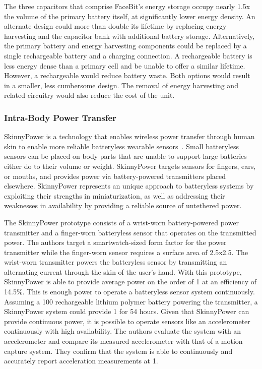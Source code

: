 The three capacitors that comprise FaceBit's energy storage occupy nearly 1.5x the volume of the primary battery itself, at significantly lower energy density.
An alternate design could more than double its lifetime by replacing energy harvesting and the capacitor bank with additional battery storage. 
Alternatively, the primary battery and energy harvesting components could be replaced by a single rechargeable battery and a charging connection.
A rechargeable battery is less energy dense than a primary cell and be unable to offer a similar lifetime. 
However, a rechargeable would reduce battery waste. 
Both options would result in a smaller, less cumbersome design. The removal of energy harvesting and related circuitry would also reduce the cost of the unit.

\subsubsection{Intra-Body Power Transfer}
SkinnyPower is a technology that enables wireless power transfer through human skin to enable more reliable batteryless wearable sensors~\cite{shukla2019skinnypower}.
Small batteryless sensors can be placed on body parts that are unable to support large batteries either do to their volume or weight.
SkinnyPower targets sensors for fingers, ears, or mouths, and provides power via battery-powered transmitters placed elsewhere.
SkinnyPower represents an unique approach to batteryless systems by exploiting their strengths in miniaturization, as well as addressing their weaknesses in availability by providing a reliable source of untethered power.

The SkinnyPower prototype consists of a wrist-worn battery-powered power transmitter 
and a finger-worn batteryless sensor that operates on the transmitted power. 
The authors target a smartwatch-sized form factor for the power transmitter while the finger-worn sensor requires a surface area of 2.5x2.5\ssi{\centi\meter\squared}.
The wrist-worn transmitter powers the batteryless sensor by transmitting an alternating current through the skin of the user's hand.
With this prototype, SkinnyPower is able to provide average power on the order of 1\ssi{\milli\watt} at an efficiency of 14.5\%. This is enough power to operate a batteryless sensor system continuously. 
Assuming a 100\ssi{\milli\Ah} rechargeable lithium polymer battery powering the transmitter, a SkinnyPower system could provide 1\ssi{\milli\watt} for 54 hours.
Given that SkinnyPower can provide continuous power, it is possible to operate sensors like an accelerometer continuously with high availability. The authors evaluate the system with an accelerometer and compare its measured accelerometer with that of a motion capture system. They confirm that the system is able to continuously and accurately report acceleration measurements at 1\ssi{\hertz}.

